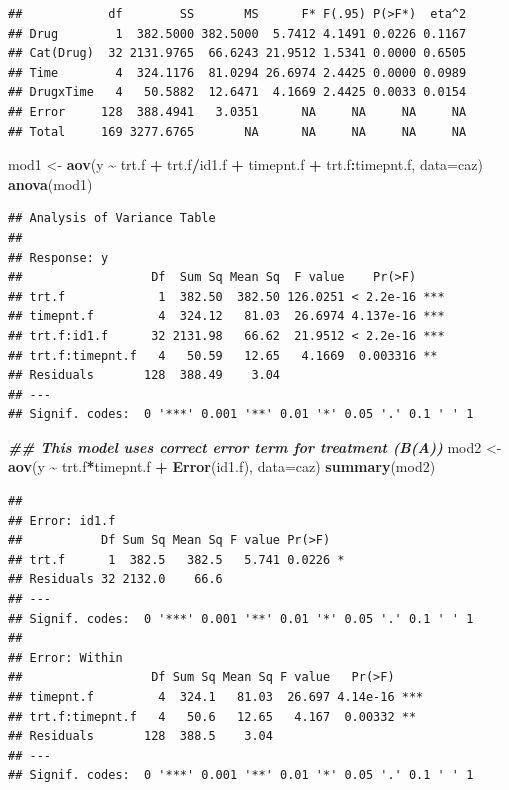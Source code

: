 \documentclass[
]{book}
\newenvironment{Shaded}{\begin{snugshade}}{\end{snugshade}}
\newcommand{\AttributeTok}[1]{\textcolor[rgb]{0.13,0.29,0.53}{#1}}
\newcommand{\DocumentationTok}[1]{\textcolor[rgb]{0.56,0.35,0.01}{\textbf{\textit{#1}}}}
\newcommand{\FunctionTok}[1]{\textcolor[rgb]{0.13,0.29,0.53}{\textbf{#1}}}
\newcommand{\NormalTok}[1]{#1}
\newcommand{\OtherTok}[1]{\textcolor[rgb]{0.56,0.35,0.01}{#1}}
\newcommand{\SpecialCharTok}[1]{\textcolor[rgb]{0.81,0.36,0.00}{\textbf{#1}}}
\begin{document}
\begin{verbatim}
##            df        SS       MS      F* F(.95) P(>F*)  eta^2
## Drug        1  382.5000 382.5000  5.7412 4.1491 0.0226 0.1167
## Cat(Drug)  32 2131.9765  66.6243 21.9512 1.5341 0.0000 0.6505
## Time        4  324.1176  81.0294 26.6974 2.4425 0.0000 0.0989
## DrugxTime   4   50.5882  12.6471  4.1669 2.4425 0.0033 0.0154
## Error     128  388.4941   3.0351      NA     NA     NA     NA
## Total     169 3277.6765       NA      NA     NA     NA     NA
\end{verbatim}

\begin{Shaded}
\begin{Highlighting}[]
\NormalTok{mod1 }\OtherTok{\textless{}{-}} \FunctionTok{aov}\NormalTok{(y }\SpecialCharTok{\textasciitilde{}}\NormalTok{ trt.f }\SpecialCharTok{+}\NormalTok{ trt.f}\SpecialCharTok{/}\NormalTok{id1.f }\SpecialCharTok{+}\NormalTok{ timepnt.f }\SpecialCharTok{+}\NormalTok{ trt.f}\SpecialCharTok{:}\NormalTok{timepnt.f,}
            \AttributeTok{data=}\NormalTok{caz)}
\FunctionTok{anova}\NormalTok{(mod1)}
\end{Highlighting}
\end{Shaded}

\begin{verbatim}
## Analysis of Variance Table
## 
## Response: y
##                  Df  Sum Sq Mean Sq  F value    Pr(>F)    
## trt.f             1  382.50  382.50 126.0251 < 2.2e-16 ***
## timepnt.f         4  324.12   81.03  26.6974 4.137e-16 ***
## trt.f:id1.f      32 2131.98   66.62  21.9512 < 2.2e-16 ***
## trt.f:timepnt.f   4   50.59   12.65   4.1669  0.003316 ** 
## Residuals       128  388.49    3.04                       
## ---
## Signif. codes:  0 '***' 0.001 '**' 0.01 '*' 0.05 '.' 0.1 ' ' 1
\end{verbatim}

\begin{Shaded}
\begin{Highlighting}[]
\DocumentationTok{\#\# This model uses correct error term for treatment (B(A))}
\NormalTok{mod2 }\OtherTok{\textless{}{-}} \FunctionTok{aov}\NormalTok{(y }\SpecialCharTok{\textasciitilde{}}\NormalTok{ trt.f}\SpecialCharTok{*}\NormalTok{timepnt.f }\SpecialCharTok{+} \FunctionTok{Error}\NormalTok{(id1.f), }\AttributeTok{data=}\NormalTok{caz)}
\FunctionTok{summary}\NormalTok{(mod2)}
\end{Highlighting}
\end{Shaded}

\begin{verbatim}
## 
## Error: id1.f
##           Df Sum Sq Mean Sq F value Pr(>F)  
## trt.f      1  382.5   382.5   5.741 0.0226 *
## Residuals 32 2132.0    66.6                 
## ---
## Signif. codes:  0 '***' 0.001 '**' 0.01 '*' 0.05 '.' 0.1 ' ' 1
## 
## Error: Within
##                  Df Sum Sq Mean Sq F value   Pr(>F)    
## timepnt.f         4  324.1   81.03  26.697 4.14e-16 ***
## trt.f:timepnt.f   4   50.6   12.65   4.167  0.00332 ** 
## Residuals       128  388.5    3.04                     
## ---
## Signif. codes:  0 '***' 0.001 '**' 0.01 '*' 0.05 '.' 0.1 ' ' 1
\end{verbatim}
\end{document}
